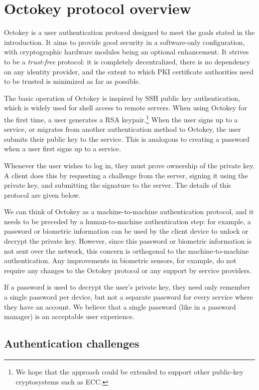 \section{Octokey protocol overview}\label{sec:protocol}

Octokey is a user authentication protocol designed to meet the goals stated in the introduction. It
aims to provide good security in a software-only configuration, with cryptographic hardware modules
being an optional enhancement. It strives to be a \emph{trust-free} protocol: it is completely
decentralized, there is no dependency on any identity provider, and the extent to which PKI
certificate authorities need to be trusted is minimized as far as possible.

The basic operation of Octokey is inspired by SSH public key authentication, which is widely used
for shell access to remote servers. When using Octokey for the first time, a user generates a RSA
keypair.\footnote{We hope that the approach could be extended to support other public-key
cryptosystems such as ECC.} When the user signs up to a service, or migrates from another
authentication method to Octokey, the user submits their public key to the service. This is
analogous to creating a password when a user first signs up to a service.

Whenever the user wishes to log in, they must prove ownership of the private key. A client does this
by requesting a challenge from the server, signing it using the private key, and submitting the
signature to the server. The details of this protocol are given below.

We can think of Octokey as a machine-to-machine authentication protocol, and it needs to be preceded
by a human-to-machine authentication step: for example, a password or biometric information can be
used by the client device to unlock or decrypt the private key. However, since this password or
biometric information is not sent over the network, this concern is orthogonal to the
machine-to-machine authentication. Any improvements in biometric sensors, for example, do not
require any changes to the Octokey protocol or any support by service providers.

If a password is used to decrypt the user's private key, they need only remember a single password
per device, but not a separate password for every service where they have an account. We believe
that a single password (like in a password manager) is an acceptable user experience.

\subsection{Authentication challenges}\label{sec:challenges}

